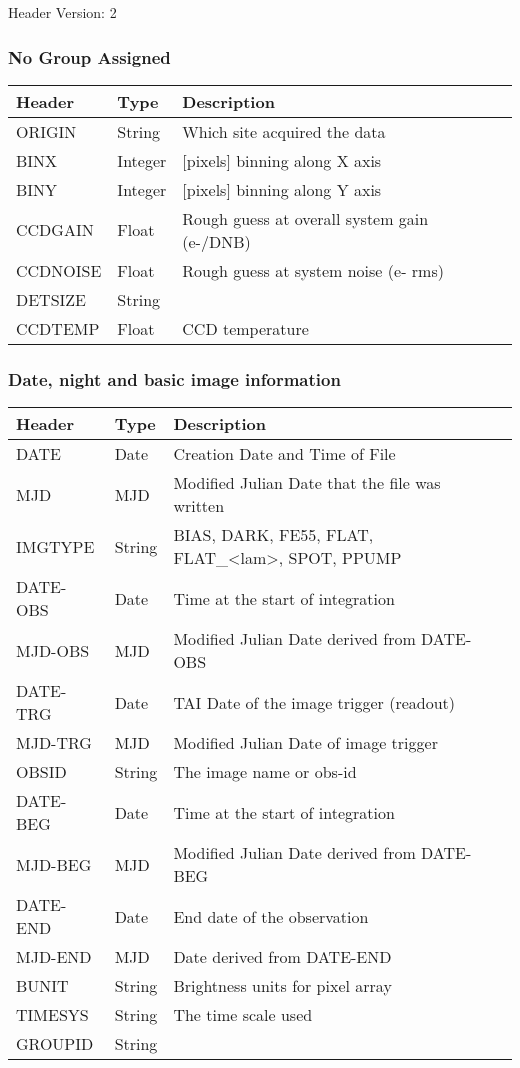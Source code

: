 Header Version: 2

\subsubsection{No Group Assigned}


\begin{tabular}{l l l l l}
\hline
Header & Type & Description \\
\hline
ORIGIN & String & Which site acquired the data \\
BINX & Integer & [pixels] binning along X axis \\
BINY & Integer & [pixels] binning along Y axis \\
CCDGAIN & Float & Rough guess at overall system gain (e-/DNB) \\
CCDNOISE & Float & Rough guess at system noise (e- rms) \\
DETSIZE & String &  \\
CCDTEMP & Float & CCD temperature \\
\hline
\end{tabular}


\subsubsection{Date, night and basic image information}


\begin{tabular}{l l l l l}
\hline
Header & Type & Description \\
\hline
DATE & Date & Creation Date and Time of File \\
MJD & MJD & Modified Julian Date that the file was written \\
IMGTYPE & String & BIAS, DARK, FE55, FLAT, FLAT\_<lam>, SPOT, PPUMP \\
DATE-OBS & Date & Time at the start of integration \\
MJD-OBS & MJD & Modified Julian Date derived from DATE-OBS \\
DATE-TRG & Date & TAI Date of the image trigger (readout) \\
MJD-TRG & MJD & Modified Julian Date of image trigger \\
OBSID & String & The image name or obs-id \\
DATE-BEG & Date & Time at the start of integration \\
MJD-BEG & MJD & Modified Julian Date derived from DATE-BEG \\
DATE-END & Date & End date of the observation \\
MJD-END & MJD & Date derived from DATE-END \\
BUNIT & String & Brightness units for pixel array \\
TIMESYS & String & The time scale used \\
GROUPID & String &  \\
\hline
\end{tabular}


